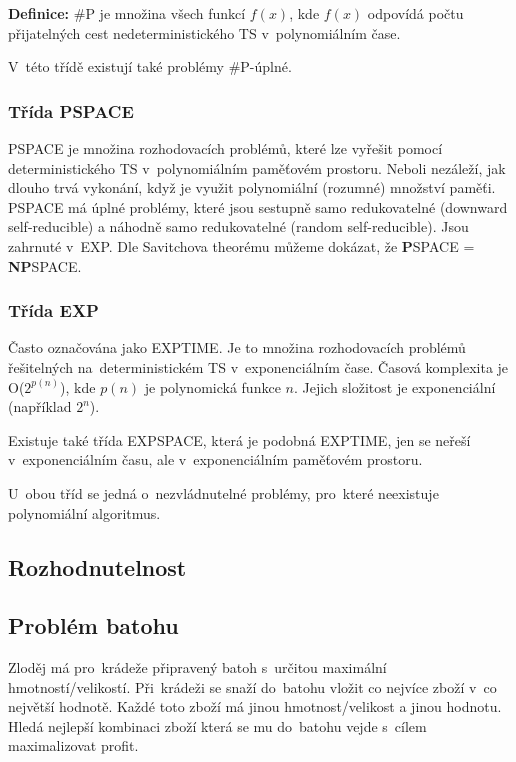 \textbf{Definice:} \#P je množina všech funkcí $f(x)$, kde $f(x)$ odpovídá počtu přijatelných cest nedeterministického TS v~polynomiálním čase.

V~této třídě existují také problémy \#P-úplné.

\subsubsection{Třída PSPACE}

PSPACE je množina rozhodovacích problémů, které lze vyřešit pomocí deterministického TS v~polynomiálním paměťovém prostoru.
Neboli nezáleží, jak dlouho trvá vykonání, když je využit polynomiální (rozumné) množství paměťi. 
PSPACE má úplné problémy, které jsou sestupně samo redukovatelné (downward self-reducible) a náhodně samo redukovatelné (random self-reducible).
Jsou zahrnuté v~EXP.
Dle Savitchova theorému můžeme dokázat, že \textbf{P}SPACE = \textbf{NP}SPACE.

\subsubsection{Třída EXP}

Často označována jako EXPTIME.
Je to množina rozhodovacích problémů řešitelných na~deterministickém TS v~exponenciálním čase.
Časová komplexita je O($2^{p(n)}$), kde $p(n)$ je polynomická funkce $n$.
Jejich složitost je exponenciální (například $2^n$).

Existuje také třída EXPSPACE, která je podobná EXPTIME, jen se neřeší v~exponenciálním času, ale v~exponenciálním paměťovém prostoru.

U~obou tříd se jedná o~nezvládnutelné problémy, pro~které neexistuje polynomiální algoritmus.

\subsection{Rozhodnutelnost}


\subsection{Problém batohu}

Zloděj má pro~krádeže připravený batoh s~určitou maximální hmotností/velikostí.
Při~krádeži se snaží do~batohu vložit co nejvíce zboží v~co největší hodnotě.
Každé toto zboží má jinou hmotnost/velikost a jinou hodnotu.
Hledá nejlepší kombinaci zboží která se mu do~batohu vejde s~cílem maximalizovat profit.

